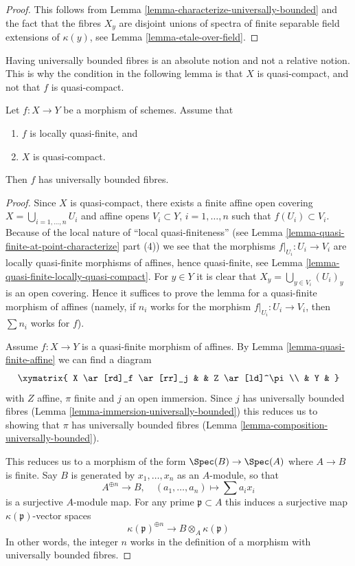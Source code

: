 \begin{proof}
This follows from
Lemma \ref{lemma-characterize-universally-bounded}
and the fact that the fibres $X_y$ are disjoint unions of spectra of finite
separable field extensions of $\kappa(y)$, see
Lemma \ref{lemma-etale-over-field}.
\end{proof}

\noindent
Having universally bounded fibres is an absolute notion and not a relative
notion. This is why the condition in the following lemma is that $X$ is
quasi-compact, and not that $f$ is quasi-compact.

\begin{lemma}
\label{lemma-locally-quasi-finite-qc-source-universally-bounded}
Let $f : X \to Y$ be a morphism of schemes.
Assume that
\begin{enumerate}
\item $f$ is locally quasi-finite, and
\item $X$ is quasi-compact.
\end{enumerate}
Then $f$ has universally bounded fibres.
\end{lemma}

\begin{proof}
Since $X$ is quasi-compact, there exists a finite affine open covering
$X = \bigcup_{i = 1, \ldots, n} U_i$ and affine opens $V_i \subset Y$,
$i = 1, \ldots, n$ such that $f(U_i) \subset V_i$.
Because of the local nature of ``local quasi-finiteness''
(see Lemma \ref{lemma-quasi-finite-at-point-characterize} part (4))
we see that the morphisms $f|_{U_i} : U_i \to V_i$ are locally
quasi-finite morphisms of affines, hence quasi-finite, see
Lemma \ref{lemma-quasi-finite-locally-quasi-compact}.
For $y \in Y$ it is clear that $X_y = \bigcup_{y \in V_i} (U_i)_y$
is an open covering. Hence it suffices to prove the lemma
for a quasi-finite morphism of affines (namely, if $n_i$ works
for the morphism $f|_{U_i} : U_i \to V_i$, then $\sum n_i$
works for $f$).

\medskip\noindent
Assume $f : X \to Y$ is a quasi-finite morphism of affines.
By Lemma \ref{lemma-quasi-finite-affine}
we can find a diagram
$$
\xymatrix{
X \ar[rd]_f \ar[rr]_j & & Z \ar[ld]^\pi \\
& Y &
}
$$
with $Z$ affine, $\pi$ finite and $j$ an open immersion. Since
$j$ has universally bounded fibres
(Lemma \ref{lemma-immersion-universally-bounded})
this reduces us to showing that $\pi$ has universally bounded
fibres (Lemma \ref{lemma-composition-universally-bounded}).

\medskip\noindent
This reduces us to a morphism of the form $\Spec(B) \to \Spec(A)$ where
$A \to B$ is finite. Say $B$ is generated by $x_1, \ldots, x_n$
as an $A$-module, so that
$$
A^{\oplus n} \longrightarrow B, \quad
(a_1, \ldots, a_n) \longmapsto \sum a_i x_i
$$
is a surjective $A$-module map. For any prime $\mathfrak p \subset A$
this induces a surjective map $\kappa(\mathfrak p)$-vector spaces
$$
\kappa(\mathfrak p)^{\oplus n} \longrightarrow B \otimes_A \kappa(\mathfrak p)
$$
In other words, the integer $n$ works in the definition
of a morphism with universally bounded fibres.
\end{proof}

